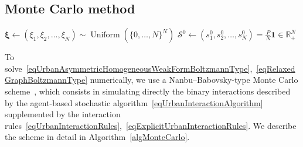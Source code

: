 \documentclass[a4paper]{article}
\begin{document}
\subsection{Monte Carlo method}
\label{secMonteCarloMethod}
%
\begin{algorithm}[!t]
    \caption{Nanbu--Babovsky-type Monte Carlo algorithm for~\eqref{eqUrbanInteractionAlgorithm}}
    \label{algMonteCarlo}
    \(\boldsymbol\xi\gets(\xi_1,\xi_2,\dots,\xi_N)\sim\operatorname{Uniform}(\{0,\dots,N\}^N)\)\;
    \(\mathcal{S}^0\gets(s_1^0,s_2^0,\dots,s_N^0)=\frac{P}{N}\mathbf 1\in\mathbb{R}_+^N\)\;\label{algMonteCarloDistribuzioneIniziale}
\end{algorithm}

To solve~\eqref{eqUrbanAsymmetricHomogeneousWeakFormBoltzmannType},~\eqref{eqRelaxedGraphBoltzmannType} numerically, we use a Nanbu--Babovsky-type Monte Carlo scheme~\cite{babovsky1986M2AS,nanbu1980JPSJ}, which consists in simulating directly the binary interactions described by the agent-based stochastic algorithm~\eqref{eqUrbanInteractionAlgorithm} supplemented by the interaction rules~\eqref{eqUrbanInteractionRules},~\eqref{eqExplicitUrbanInteractionRules}. We describe the scheme in detail in Algorithm~\ref{algMonteCarlo}.
\end{document}
